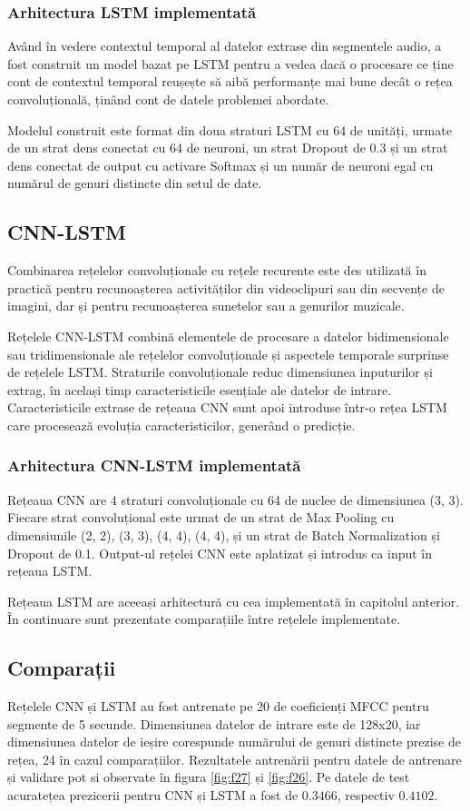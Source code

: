 \subsubsection{Arhitectura LSTM implementată}
Având în vedere contextul temporal al datelor extrase din segmentele audio,
a fost construit un model bazat pe LSTM pentru a vedea dacă o procesare ce ține
cont de contextul temporal reușește să aibă performanțe mai bune decât o
rețea convoluțională, ținând cont de datele problemei abordate.

Modelul construit este format din doua straturi LSTM cu 64 de unități, urmate de un strat
dens conectat cu 64 de neuroni, un strat Dropout de 0.3 și un strat dens conectat de
output cu activare Softmax și un număr de neuroni egal cu numărul de genuri distincte
din setul de date.

\subsection{CNN-LSTM}

Combinarea rețelelor convoluționale cu rețele recurente este des utilizată în practică pentru
recunoașterea activităților din videoclipuri sau din secvențe de imagini, dar și pentru recunoașterea
sunetelor sau a genurilor muzicale.

Rețelele CNN-LSTM combină elementele de procesare a datelor bidimensionale sau
tridimensionale ale rețelelor convoluționale și aspectele temporale surprinse de
rețelele LSTM. Straturile convoluționale reduc dimensiunea inputurilor și extrag, în
același timp caracteristicile esențiale ale datelor de intrare. Caracteristicile
extrase de rețeaua CNN sunt apoi introduse într-o rețea LSTM care procesează evoluția
caracteristicilor, generând o predicție.

\subsubsection{Arhitectura CNN-LSTM implementată}
Rețeaua CNN are 4 straturi convoluționale cu 64 de nuclee de dimensiunea (3, 3). Fiecare strat
convoluțional este urmat de un strat de Max Pooling cu dimensiunile (2, 2), (3, 3), (4, 4), (4, 4),
și un strat de Batch Normalization și Dropout de 0.1. Output-ul rețelei CNN este aplatizat și introdus ca input în
rețeaua LSTM.

Rețeaua LSTM are aceeași arhitectură cu cea implementată în capitolul anterior. În continuare
sunt prezentate comparațiile între rețelele implementate.
\subsection{Comparații}
Rețelele CNN și LSTM au fost antrenate pe 20 de coeficienți MFCC pentru segmente de 5 secunde.
Dimensiunea datelor de intrare este de 128x20, iar dimensiunea datelor de ieșire corespunde numărului de genuri distincte prezise de rețea, 24 în cazul
comparațiilor.
Rezultatele antrenării pentru datele de antrenare și validare pot si observate în figura \ref{fig:f27} și \ref{fig:f26}. Pe datele de test
acuratețea prezicerii pentru CNN și LSTM a fost de $0.3466$, respectiv $0.4102$.

